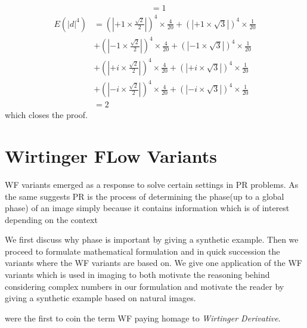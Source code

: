 \begin{Proof}
\begin{equation*}
\begin{split}
			 &= 1
		\end{split}
	  \end{equation*}
	  \begin{equation*}
		\begin{split}
		E(\left|d\right|^4) &= \left(\left|+1 \times \frac{\sqrt{2}}{2}\right|\right)^4 \times \frac{4}{20} + \left(\left|+1 \times \sqrt{3}\right|\right)^4 \times \frac{1}{20}\\
		                    &+\left(\left|-1 \times \frac{\sqrt{2}}{2}\right|\right)^4 \times \frac{4}{20}+\left(\left|-1 \times \sqrt{3}\right|\right)^4 \times \frac{1}{20}\\
		                    &+ \left(\left|+i \times \frac{\sqrt{2}}{2}\right|\right)^4 \times \frac{4}{20} + \left(\left|+i \times \sqrt{3}\right|\right)^4 \times \frac{1}{20}\\
							&+\left(\left|-i \times \frac{\sqrt{2}}{2}\right|\right)^4 \times \frac{4}{20}+\left(\left|-i \times \sqrt{3}\right|\right)^4 \times \frac{1}{20}\\ 
			 &= 2
		\end{split}
	 \end{equation*}
	 which closes the proof.
\end{Proof}





\section{Wirtinger FLow Variants}
\ac{WF} variants emerged as a response to solve certain settings in \ac{PR} problems. As the same suggests \ac{PR} is the process of 
determining the phase(up to a global phase) of an image simply because it contains information which is of interest depending on the context

 

We first discuss why phase is important by giving a synthetic example. Then we proceed to formulate mathematical formulation and in quick succession 
the variants where the \ac{WF} variants are based on. We give one application of the \ac{WF} variants which is used in imaging 
to both motivate the reasoning behind considering complex numbers in our formulation and motivate the reader by giving a synthetic example based on 
natural images. 


 




\cite{Candes2014} were the first to coin the term \ac{WF} paying homage to \emph{Wirtinger Derivative}. 

















